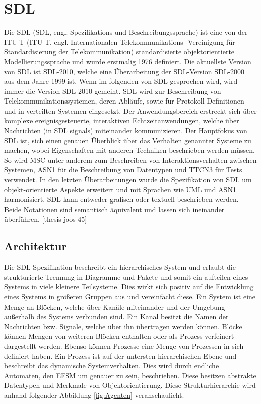 \section{\acf{SDL}}
\label{sc:SDL}
Die \ac{SDL} (\ac{SDL}, engl. Spezifikations und Beschreibungssprache) ist eine von der \ac{ITU-T} (\ac{ITU-T}, engl. Internationalen 
Telekommunikations- Vereinigung für Standardisierung der Telekommunikation) standardisierte objektorientierte Modellierungssprache und wurde erstmalig 
1976 definiert. Die aktuellste Version von \ac{SDL} ist \ac{SDL}-2010, welche eine Überarbeitung der \ac{SDL}-Version \ac{SDL}-2000 aus dem Jahre 
1999 ist. Wenn im folgenden von \ac{SDL} gesprochen wird, wird immer die Version \acs{SDL}-2010 gemeint. 
\ac{SDL} wird zur Beschreibung von Telekommunikationssystemen, deren Abläufe, sowie für Protokoll Definitionen und in verteilten Systemen eingesetzt.
Der Anwendungsbereich erstreckt sich über komplexe ereignisgesteuerte, interaktiven Echtzeitanwendungen, welche über Nachrichten (in \ac{SDL} signals) miteinander kommunizieren. 
Der Hauptfokus von \ac{SDL} ist, sich einen genauen Überblick über das Verhalten genannter Systeme zu machen, wobei Eigenschaften mit anderen Techniken beschrieben werden müssen. 
So wird \ac{MSC} unter anderem zum Beschreiben von Interaktionsverhalten zwischen Systemen, \ac{ASN1} für die Beschreibung von Datentypen und \ac{TTCN3} für Tests verwendet. In den letzten Überarbeitungen wurde die Spezifikation von \ac{SDL} um objekt-orientierte Aspekte erweitert und mit Sprachen wie \ac{UML} und \ac{ASN1} harmonisiert. \ac{SDL} kann entweder grafisch oder textuell beschrieben werden. Beide Notationen sind semantisch äquivalent und lassen sich ineinander überführen.
[thesis joos 45]

\subsection{Architektur}
\label{ssc:Architektur}
Die \ac{SDL}-Spezifikation beschreibt ein hierarchisches System und erlaubt die strukturierte Trennung in Diagramme und Pakete und somit ein aufteilen eines Systems in viele kleinere Teilsysteme. Dies wirkt sich positiv auf die Entwicklung eines Systems in größeren Gruppen aus und vereinfacht diese. Ein System ist eine Menge an Blöcken, welche über Kanäle miteinander und der Umgebung außerhalb des Systems verbunden sind. Ein Kanal besitzt die Namen der Nachrichten bzw. Signale, welche über ihn übertragen werden können. Blöcke können Mengen von weiteren Blöcken enthalten oder  als Prozess verfeinert dargestellt werden. Ebenso können Prozesse eine Menge von Prozessen in sich definiert haben.
Ein Prozess ist auf der untersten hierarchischen Ebene und beschreibt das dynamische Systemverhalten. Dies wird durch endliche Automaten, den \ac{EFSM} um genauer zu sein, beschrieben. Diese besitzen abstrakte Datentypen und Merkmale von Objektorientierung. Diese Strukturhierarchie wird anhand folgender Abbildung \ref{fig:Agenten} veranschaulicht.
 
